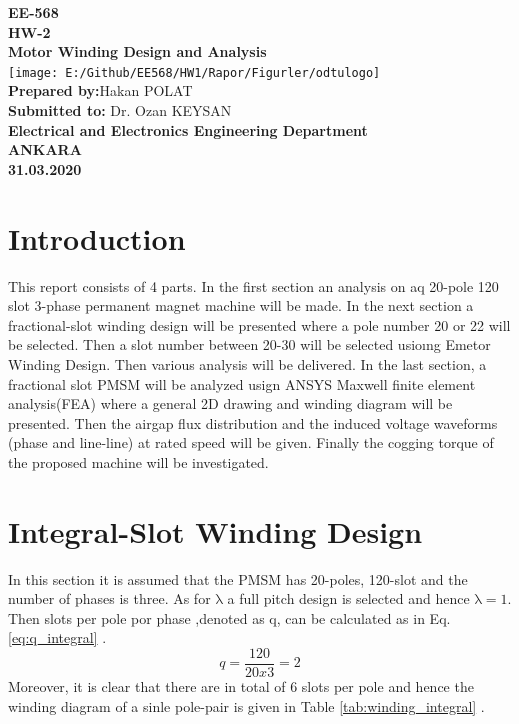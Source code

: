 \documentclass{article}
\begin{document}
\begin{titlepage}
	\begin{center}
		\Huge\textbf{EE-568 }\\
		\vspace{0.5cm}
		\Huge\textbf{HW-2}\\
		\vspace{0.5cm}
		\Huge\textbf{Motor Winding Design and Analysis}\\
		\vspace{0.5cm}
		\texttt{[image: E:/Github/EE568/HW1/Rapor/Figurler/odtulogo]}\\
		
		
		\Large\textbf{Prepared by:}Hakan POLAT\\
		
		\Large\textbf{Submitted to:} Dr. Ozan KEYSAN\\
		\vspace{0.5cm}
		\Large\textbf{Electrical and Electronics Engineering Department}\\
		
		\large\textbf{ANKARA	}\\
		\large\textbf{31.03.2020}\\	
		
		
	\end{center}
	
	

\end{titlepage}
\tableofcontents
\newpage
\section{Introduction}
This report consists of 4 parts. In the first section an analysis on aq 20-pole 120 slot 3-phase permanent magnet machine will be made. In the next section a fractional-slot winding design will be presented where a pole number 20 or 22 will be selected. Then a slot number between 20-30 will be selected usioıng Emetor Winding Design. Then various analysis will be delivered. In the last section, a fractional slot PMSM will be analyzed usign ANSYS Maxwell finite element analysis(FEA) where a general 2D drawing and winding diagram will be presented. Then the airgap flux distribution and the induced voltage waveforms (phase and line-line) at rated speed will be given. Finally the cogging torque of the proposed machine will be investigated.

\section{Integral-Slot Winding Design}
In this section it is assumed that the PMSM has 20-poles, 120-slot and the number of phases is three. As for $\mathrm{\lambda}$
a full pitch design is selected and hence $\mathrm{\lambda=1}$. Then slots per pole por phase ,denoted as q, can be calculated as in Eq. \ref{eq:q_integral} .
\begin{equation}
	q=\frac{120}{20x3}=2
	\label{eq:q_integral}
\end{equation}
Moreover, it is clear that there are in total of 6 slots per pole and hence the winding diagram of a sinle pole-pair is given in Table \ref{tab:winding_integral} .
\end{document}
